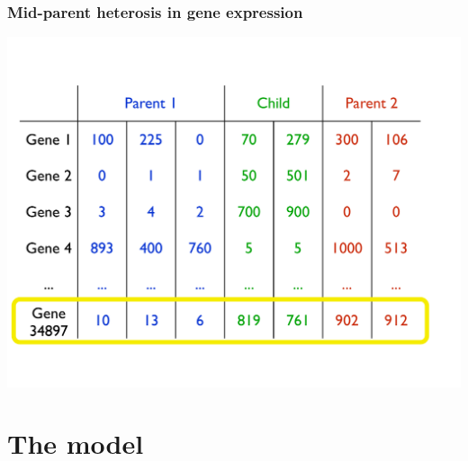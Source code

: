 \documentclass[handout]{beamer}
\numberwithin{equation}{section}
\begin{document}
\begin{frame}
\frametitle{Mid-parent heterosis in gene expression}
\begin{center}
\includegraphics[scale=.35]{fig/mphrnaseq}
\end{center}
\end{frame}


\section{The model}
\setcounter{subsection}{1}
\end{document}
